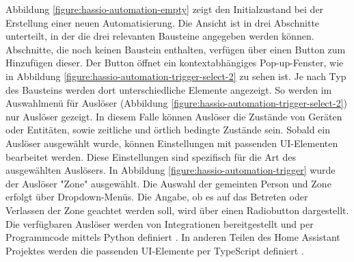 Abbildung \ref{figure:hassio-automation-empty} zeigt den Initialzustand bei der Erstellung einer neuen Automatisierung. Die Ansicht ist in drei Abschnitte unterteilt, in der die drei relevanten Bausteine angegeben werden können. Abschnitte, die noch keinen Baustein enthalten, verfügen über einen Button zum Hinzufügen dieser. Der Button öffnet ein kontextabhängiges Pop-up-Fenster, wie in Abbildung \ref{figure:hassio-automation-trigger-select-2} zu sehen ist. Je nach Typ des Bausteins werden dort unterschiedliche Elemente angezeigt. So werden im Auswahlmenü für Auslöser (Abbildung \ref{figure:hassio-automation-trigger-select-2}) nur Auslöser gezeigt. In diesem Falle können Auslöser die Zustände von Geräten oder Entitäten, sowie zeitliche und örtlich bedingte Zustände sein. Sobald ein Auslöser ausgewählt wurde, können Einstellungen mit passenden UI-Elementen bearbeitet werden. Diese Einstellungen sind spezifisch für die Art des ausgewählten Auslösers. In Abbildung \ref{figure:hassio-automation-trigger} wurde der Auslöser "Zone" ausgewählt. Die Auswahl der gemeinten Person und Zone erfolgt über Dropdown-Menüs. Die Angabe, ob es auf das Betreten oder Verlassen der Zone geachtet werden soll, wird über einen Radiobutton dargestellt. Die verfügbaren Auslöser werden von Integrationen bereitgestellt und per Programmcode mittels Python definiert \parencite{openhomefoundationDeviceAutomations2023}. In anderen Teilen des Home Assistant Projektes werden die passenden \ac{UI}-Elemente per TypeScript definiert \parencite{openhomefoundationHomeassistantFrontend}.

